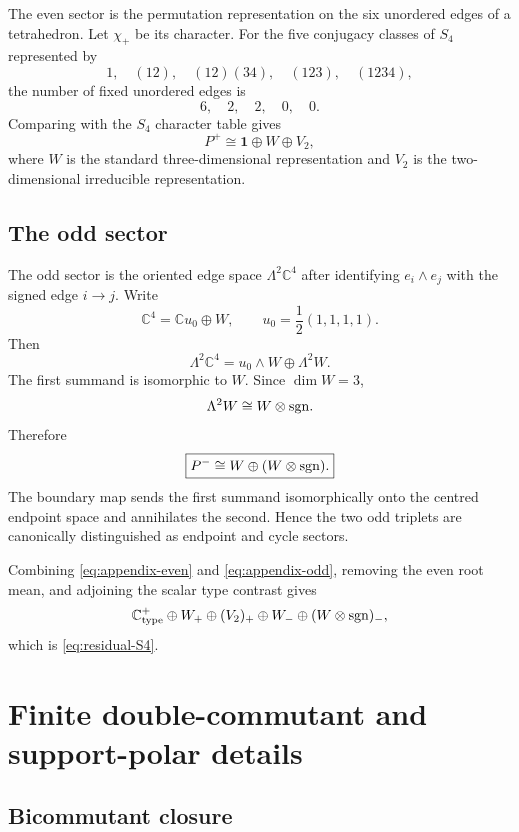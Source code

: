 \documentclass[11pt]{article}
\theoremstyle{definition}
\theoremstyle{remark}
\newcommand{\C}{\mathbb C}
\begin{document}
The even sector is the permutation representation on the six unordered edges
of a tetrahedron.  Let $\chi_+$ be its character.  For the five conjugacy
classes of $S_4$ represented by
\[
1,\quad (12),\quad (12)(34),\quad (123),\quad (1234),
\]
the number of fixed unordered edges is
\[
6,\quad 2,\quad 2,\quad 0,\quad 0.
\]
Comparing with the $S_4$ character table gives
\begin{equation}
\boxed{
P^+
\cong
\mathbf1\oplus W\oplus V_2,}
\label{eq:appendix-even}
\end{equation}
where $W$ is the standard three-dimensional representation and $V_2$ is the
two-dimensional irreducible representation.

\subsection{The odd sector}

The odd sector is the oriented edge space
$\Lambda^2\C^4$ after identifying
$e_i\wedge e_j$ with the signed edge $i\to j$.  Write
\[
\C^4=\C u_0\oplus W,
\qquad
u_0=\frac12(1,1,1,1).
\]
Then
\[
\Lambda^2\C^4
=
u_0\wedge W\oplus\Lambda^2W.
\]
The first summand is isomorphic to $W$.  Since $\dim W=3$,
\[
\Lambda^2W\cong W\otimes{\rm sgn}.
\]
Therefore
\begin{equation}
\boxed{
P^-
\cong
W\oplus(W\otimes{\rm sgn}).}
\label{eq:appendix-odd}
\end{equation}
The boundary map sends the first summand isomorphically onto the centred
endpoint space and annihilates the second.  Hence the two odd triplets are
canonically distinguished as endpoint and cycle sectors.

Combining \eqref{eq:appendix-even} and \eqref{eq:appendix-odd}, removing the
even root mean, and adjoining the scalar type contrast gives
\[
\C_{\rm type}^{+}
\oplus W_+\oplus(V_2)_+
\oplus W_-\oplus(W\otimes{\rm sgn})_-,
\]
which is \eqref{eq:residual-S4}.

\section{Finite double-commutant and support-polar details}
\label{app:commutant}

\subsection{Bicommutant closure}
\end{document}
